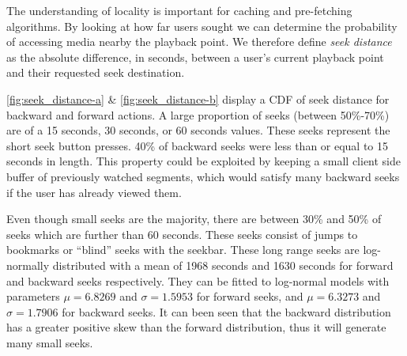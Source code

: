 The understanding of locality is important for caching and pre-fetching algorithms. By looking at how far users sought we can determine the probability of accessing media nearby the playback point. We therefore define \emph{seek distance} as the absolute difference, in seconds, between a user's current playback point and their requested seek destination.

\autoref{fig:seek_distance-a} \& \autoref{fig:seek_distance-b} display a CDF of seek distance for backward and forward actions. A large proportion of seeks (between 50\%-70\%) are of a 15 seconds, 30 seconds, or 60 seconds values. These seeks represent the short seek button presses.
40\% of backward seeks were less than or equal to 15 seconds in length. This property could be exploited by keeping a small client side buffer of previously watched segments, which would satisfy many backward seeks if the user has already viewed them.





Even though small seeks are the majority, there are between 30\% and 50\% of seeks which are further than 60 seconds. These seeks consist of jumps to bookmarks or ``blind'' seeks with the seekbar. These long range seeks are log-normally distributed with a mean of 1968 seconds and 1630 seconds for forward and backward seeks respectively. They can be fitted to log-normal models with parameters $\mu = 6.8269$ and $\sigma = 1.5953$ for forward seeks, and $\mu = 6.3273$ and $\sigma = 1.7906$ for backward seeks. It can been seen that the backward distribution has a greater positive skew than the forward distribution, thus it will generate many small seeks.

